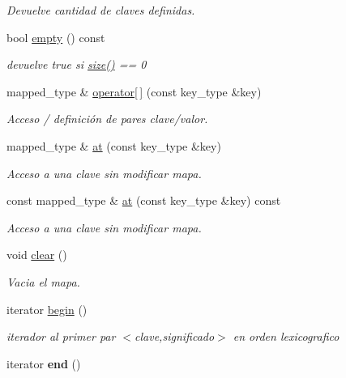 \begin{DoxyCompactItemize}
\begin{DoxyCompactList}\small\item\em Devuelve cantidad de claves definidas. \end{DoxyCompactList}\item 
\hypertarget{classstring__map_a9a83f6f168f104c5d6c05c3fb989ad1f}{bool \hyperlink{classstring__map_a9a83f6f168f104c5d6c05c3fb989ad1f}{empty} () const }\label{classstring__map_a9a83f6f168f104c5d6c05c3fb989ad1f}

\begin{DoxyCompactList}\small\item\em devuelve true si \hyperlink{classstring__map_af6a00aaeaf63ed9798c403e714a4be0c}{size()} == 0 \end{DoxyCompactList}\item 
mapped\-\_\-type \& \hyperlink{classstring__map_aa018c2602a9a5af3255a443c79ea2183}{operator\mbox{[}$\,$\mbox{]}} (const key\-\_\-type \&key)
\begin{DoxyCompactList}\small\item\em Acceso / definición de pares clave/valor. \end{DoxyCompactList}\item 
mapped\-\_\-type \& \hyperlink{classstring__map_a8b2130f62d90d808d4ac464d21b5c56f}{at} (const key\-\_\-type \&key)
\begin{DoxyCompactList}\small\item\em Acceso a una clave sin modificar mapa. \end{DoxyCompactList}\item 
const mapped\-\_\-type \& \hyperlink{classstring__map_a4408bd0af4165a420d8d69c79e531e6b}{at} (const key\-\_\-type \&key) const 
\begin{DoxyCompactList}\small\item\em Acceso a una clave sin modificar mapa. \end{DoxyCompactList}\item 
\hypertarget{classstring__map_a5e0460b9c8c6f7c6e5f76e0112446842}{void \hyperlink{classstring__map_a5e0460b9c8c6f7c6e5f76e0112446842}{clear} ()}\label{classstring__map_a5e0460b9c8c6f7c6e5f76e0112446842}

\begin{DoxyCompactList}\small\item\em Vacia el mapa. \end{DoxyCompactList}\item 
iterator \hyperlink{classstring__map_a0358017b36ffd38631af12c8b24b412a}{begin} ()
\begin{DoxyCompactList}\small\item\em iterador al primer par $<$clave,significado$>$ en orden lexicografico \end{DoxyCompactList}\item 
\hypertarget{classstring__map_a53b1e7c5a41fd315a6738efb68b7fb5b}{iterator {\bfseries end} ()}\label{classstring__map_a53b1e7c5a41fd315a6738efb68b7fb5b}


\end{DoxyCompactItemize}
